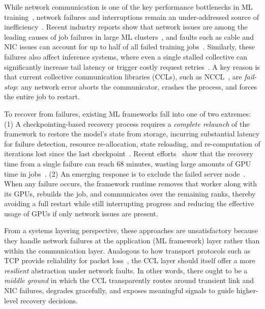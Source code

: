 \documentclass[letterpaper,twocolumn,10pt]{article}
\begin{document}
While network communication is one of the key performance bottlenecks in ML training~\cite{Megascalemoe,zhou2025accelerating,wang2023zeroplusplus,song2023optimus}, network failures and interruptions remain an under-addressed source of inefficiency~\cite{wang2024towards, yu2023understanding, Revisiting_Reliability}.
Recent industry reports show that network issues are among the leading causes of job failures in large ML clusters~\cite{llama3, Revisiting_Reliability, liu2024hostmesh, wan2025robust}, and faults such as cable and NIC issues can account for up to half of all failed training jobs~\cite{unicron}. Similarly, these failures also affect inference systems, where even a single stalled collective can significantly increase tail latency or trigger costly request retries~\cite{ICML2024}. A key reason is that current collective communication libraries (CCLs), such as NCCL~\cite{NCCL}, are {\em fail-stop}: any network error aborts the communicator, crashes the process, and forces the entire job to restart.

To recover from failures, existing ML frameworks fall into one of two extremes: (1) A checkpointing-based recovery process requires a \textit{complete relaunch} of the framework to restore the model's state from storage, incurring substantial latency for failure detection, resource re-allocation, state reloading, and re-computation of iterations lost since the last checkpoint~\cite{bytecheckpoint,eisenman2022check,gupta2024just,mohan2021checkfreq,wang2023gemini}. Recent efforts~\cite{unicron,megascale} show that the recovery time from a single failure can reach 68 minutes, wasting large amounts of GPU time in jobs~\cite{wang2023gemini}. (2) An emerging response is to exclude the failed server node~\cite{oobleck,gandhi2024recycle}. When any failure occurs, the framework runtime removes that worker along with its GPUs, rebuilds the job, and communicates over the remaining ranks, thereby avoiding a full restart while still interrupting progress and reducing the effective usage of GPUs if only network issues are present.

From a systems layering perspective, these approaches are unsatisfactory because they handle network failures at the application (ML framework) layer rather than within the communication layer. Analogous to how transport protocols such as TCP provide reliability for packet loss~\cite{saltzer1984end,zimmermann1980osi}, the CCL layer should itself offer a more \textit{resilient} abstraction under network faults. In other words, there ought to be a \textit{middle ground} in which the CCL transparently routes around transient link and NIC failures, degrades gracefully, and exposes meaningful signals to guide higher-level recovery decisions.
\end{document}
